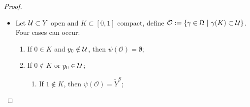 \begin{proof}
\begin{itemize}
 Take some $t_0\in ]0,1[$ such that $\gamma([t_0,1])\subset p(\U)$.
 Since $Y\setminus S$ is semi-locally simply connected, for all $t\in [0,t_0]$ there exists some path-connected open neighborhood $\V\subset Y\setminus S$ of $\gamma(t)$ such that all loop in $\V$ are homotopically trivial in $Y\setminus S$. By compactness, we can choose finitely many such neighborhoods $(\V_i)_{i\in\lsem 1,n \rsem}$ as well as an increasing sequence $\alpha\in [0,t_0]^{\lsem 0,n\rsem}$ such that :
 $\alpha_0=0, \alpha_n=t_0$ and $\forall i\in \lsem 1,n\rsem,\ \gamma([\alpha_{i-1},\alpha_i]) \subset \V_i$. 
 Define $\V_{n+1}:=\U$ and $\W_i$ the connected component of $\gamma(\alpha_i)$ in $\V_i\cap\V_{i+1}$ for $i\in \lsem 1,n\rsem$ and define 
 $$\mathcal O := \left\{\eta\in \Omega ~\left|~\begin{array}{l}
                                                     \forall i\in \lsem 1,n\rsem, \eta([\alpha_{i-1},\alpha_i])\subset \V_i)  \\ \forall i\in \lsem 1,n\rsem,\ \eta(\alpha_i)\in\W_i \\ 
                                                     \eta([t_0,1])\subset p(\U)
                                                      \end{array} \right.\right\}.$$
$\mathcal O$ is an open neighborhood of $\gamma$ for the compact-open topology of $\Omega$. Let $\eta\in \mathcal O$, forall $i\in \lsem 1,n\rsem $, choose a path  $\omega_i \in 
\Omega(\gamma(\alpha_i),\eta(\alpha_i),\W_i)$. We also define $\omega_0$ as the 
constant path at $y_0$. We notice that for all $i\in \lsem 1,n,\rsem$, the loop $
\gamma_{|[\alpha_{i-1},\alpha_i]}*\omega_i*(\eta_{|[\alpha_{i-1},\alpha_i]})^{-1}*\omega_{i-1} $ is homotopically trivial. Therefore, $\eta$ is homotopic to the loop 
$\eta':=\gamma_{|[0,t_0]}*\omega_n*\eta_{|[t_0,1]}$. Consider the lifts $\hat\gamma$
and $\hat\eta'$ of $\gamma$ and $\eta'$ respectively, both starting at $\hat y_0$. They are equal on $[0,t_0]$; since $\gamma$ and $\eta$ both stay in $p(\U)$, the paths $\hat\gamma$ and $\hat\eta'$ stay in the same connected component of $p^{-1}(p(\U))$, hence they both stay in $\U$. We then deduce that $\psi(\eta)=\hat\eta'(1)\in \U$ thus $\psi(\mathcal O)\subset \U$.
Finally, $\psi$ is continuous, then so is $\overline \psi$.

\item Let $\mathcal{U}\subset Y$ open and $K\subset [0,1]$ compact, define 
$\mathcal O := \{ \gamma\in \Omega~|~ \gamma(K)\subset \mathcal{U} \}$. Four cases can occur:
\begin{enumerate}
 \item If $0\in K$ and $y_0 \notin \mathcal{U} $, then $\psi(\mathcal O)= \emptyset$;
 \item If $0\notin K$ or $y_0 \in \mathcal{U}$;
    \begin{enumerate}
     \item If $1 \notin K$, then $\psi(\mathcal O)=\widetilde Y^S$;
     

\end{enumerate}
\end{enumerate}
\end{itemize}
\end{proof}
